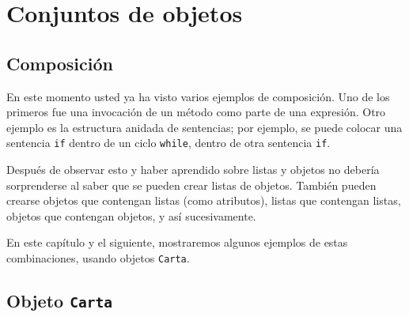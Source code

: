 


\chapter{Conjuntos de objetos}

\section{Composición}

En este momento usted ya ha visto varios ejemplos de composición. Uno de los
primeros fue una invocación de un método como parte de una expresión. Otro 
ejemplo es la estructura anidada de sentencias; por ejemplo, se puede colocar una 
sentencia \texttt{if} dentro de un ciclo \texttt{while}, dentro de otra 
sentencia \texttt{if}.

Después de observar esto y haber aprendido sobre listas y objetos no debería
sorprenderse al saber que se pueden crear listas de objetos. También pueden
crearse objetos que contengan listas (como atributos), listas
que contengan listas, objetos que contengan objetos, y así 
sucesivamente.

En este capítulo y el siguiente, mostraremos algunos ejemplos de estas
combinaciones, usando objetos \texttt{Carta}.


\section{Objeto \texttt{Carta} }

